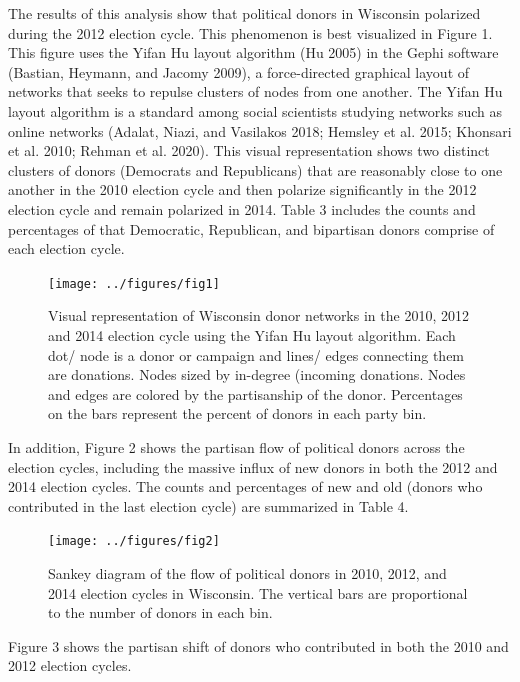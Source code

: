 \documentclass[12pt,]{article}
\begin{document}
The results of this analysis show that political donors in Wisconsin
polarized during the 2012 election cycle. This phenomenon is best
visualized in Figure 1. This figure uses the Yifan Hu layout algorithm
(Hu 2005) in the Gephi software (Bastian, Heymann, and Jacomy 2009), a
force-directed graphical layout of networks that seeks to repulse
clusters of nodes from one another. The Yifan Hu layout algorithm is a
standard among social scientists studying networks such as online
networks (Adalat, Niazi, and Vasilakos 2018; Hemsley et al. 2015;
Khonsari et al. 2010; Rehman et al. 2020). This visual representation
shows two distinct clusters of donors (Democrats and Republicans) that
are reasonably close to one another in the 2010 election cycle and then
polarize significantly in the 2012 election cycle and remain polarized
in 2014. Table 3 includes the counts and percentages of that Democratic,
Republican, and bipartisan donors comprise of each election cycle.

\begin{figure}

{\centering \texttt{[image: ../figures/fig1]} 

}

\caption{Visual representation of Wisconsin donor networks in the 2010, 2012 and 2014 election cycle using the Yifan Hu layout algorithm. Each dot/ node is a donor or campaign and lines/ edges connecting them are donations. Nodes sized by in-degree (incoming donations. Nodes and edges are colored by the partisanship of the donor. Percentages on the bars represent the percent of donors in each party bin.}\label{fig:unnamed-chunk-3}
\end{figure}

In addition, Figure 2 shows the partisan flow of political donors across
the election cycles, including the massive influx of new donors in both
the 2012 and 2014 election cycles. The counts and percentages of new and
old (donors who contributed in the last election cycle) are summarized
in Table 4.

\begin{figure}
\texttt{[image: ../figures/fig2]} \caption{Sankey diagram of the flow of political donors in 2010, 2012, and 2014 election cycles in Wisconsin. The vertical bars are proportional to the number of donors in each bin.}\label{fig:unnamed-chunk-4}
\end{figure}

Figure 3 shows the partisan shift of donors who contributed in both the
2010 and 2012 election cycles.
\end{document}
